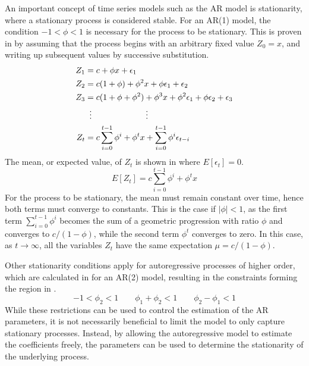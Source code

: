         An important concept of time series models such as the AR model is stationarity, where a stationary process is considered stable. For an AR(1) model, the condition $-1<\phi<1$ is necessary for the process to be stationary. This is proven in \cite{alonso2012autoregressive} by assuming that the process begins with an arbitrary fixed value $Z_0=x$, and writing up subsequent values by successive substitution.
        \begin{equation}
            \begin{split}
                Z_1 & = c + \phi x + \epsilon_1 \\
                Z_2 & = c(1+\phi) + \phi^2x+\phi\epsilon_1 + \epsilon_2 \\
                Z_3 & = c(1+\phi+\phi^2) + \phi^3x + \phi^2\epsilon_1 + \phi\epsilon_2 + \epsilon_3 \\
                & \vdotswithin{=}\qquad\qquad\qquad \vdots \\
                Z_t & = c\sum_{i=0}^{t-1}\phi^i + \phi^tx + \sum_{i=0}^{t-1}\phi^i\epsilon_{t-i}
            \end{split}
        \end{equation}
        The mean, or expected value, of $Z_t$ is shown in  where $E[\epsilon_t]=0$.
        \begin{equation}\label{eq:ar-expectation}
            E[Z_t] = c\sum_{i=0}^{t-1}\phi^i+\phi^tx
        \end{equation}
        For the process to be stationary, the mean must remain constant over time, hence both terms must converge to constants. This is the case if $|\phi|<1$, as the first term $\sum_{i=0}^{t-1}\phi^i$ becomes the sum of a geometric progression with ratio $\phi$ and converges to $c/(1-\phi)$, while the second term $\phi^t$ converges to zero. In this case, as $t\rightarrow\infty$, all the variables $Z_t$ have the same expectation $\mu=c/(1-\phi)$.
        
        Other stationarity conditions apply for autoregressive processes of higher order, which are calculated in \cite{giles2012stationarity} for an AR(2) model, resulting in the constraints forming the region in .
        \begin{equation}\label{eq:ar-2-constraints}
            -1<\phi_2<1 \qquad \phi_1+\phi_2<1 \qquad \phi_2-\phi_1<1
        \end{equation}
        While these restrictions can be used to control the estimation of the AR parameters, it is not necessarily beneficial to limit the model to only capture stationary processes. Instead, by allowing the autoregressive model to estimate the coefficients freely, the parameters can be used to determine the stationarity of the underlying process.
        

